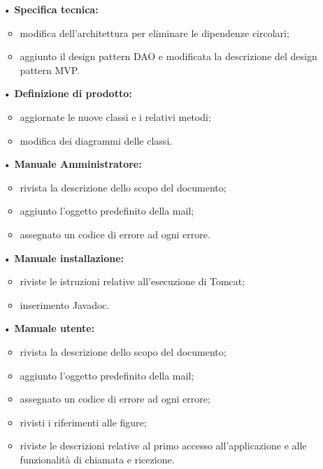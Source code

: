 {{{\begin{itemize}
			\item[•] \textbf{Specifica tecnica:}
				\begin{itemize}
					\item modifica dell'architettura per eliminare le dipendenze circolari;
					\item aggiunto il design pattern DAO e modificata la descrizione del design pattern MVP.
				\end{itemize}
			
			\item[•] \textbf{Definizione di prodotto:}
				\begin{itemize}	
					\item aggiornate le nuove classi e i relativi metodi;
					\item modifica dei diagrammi delle classi.
				\end{itemize}
				
			\item[•] \textbf{Manuale Amministratore:}
				\begin{itemize}	
					\item rivista la descrizione dello scopo del documento;
					\item aggiunto l'oggetto predefinito della mail;
					\item assegnato un codice di errore ad ogni errore.
				\end{itemize}		
			
			\item[•] \textbf{Manuale installazione:}
				\begin{itemize}
					\item riviste le istruzioni relative all'esecuzione di Tomcat;
					\item inserimento Javadoc.
				\end{itemize}
					
			\item[•] \textbf{Manuale utente:}
				\begin{itemize}	
					\item rivista la descrizione dello scopo del documento;
					\item aggiunto l'oggetto predefinito della mail;
					\item assegnato un codice di errore ad ogni errore;
					\item rivisti i riferimenti alle figure;
					\item riviste le descrizioni relative al primo accesso all'applicazione e alle funzionalità di chiamata e ricezione.
				\end{itemize}				
			 

\end{itemize}}}}
